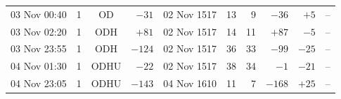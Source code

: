 \begin{tabular}{llcrlrrrrr}
03 Nov 00:40 & 1 & OD & $-31$ & 02 Nov 1517 & 13 & 9 & $-36$ & $+5$ & -- \\
03 Nov 02:20 & 1 & ODH & $+81$ & 02 Nov 1517 & 14 & 11 & $+87$ & $-5$ & -- \\
03 Nov 23:55 & 1 & ODH & $-124$ & 02 Nov 1517 & 36 & 33 & $-99$ & $-25$ & -- \\
04 Nov 01:30 & 1 & ODHU & $-22$ & 02 Nov 1517 & 38 & 34 & $-1$ & $-21$ & -- \\
04 Nov 23:05 & 1 & ODHU & $-143$ & 04 Nov 1610 & 11 & 7 & $-168$ & $+25$ & -- \\
\bottomrule
\end{tabular}

